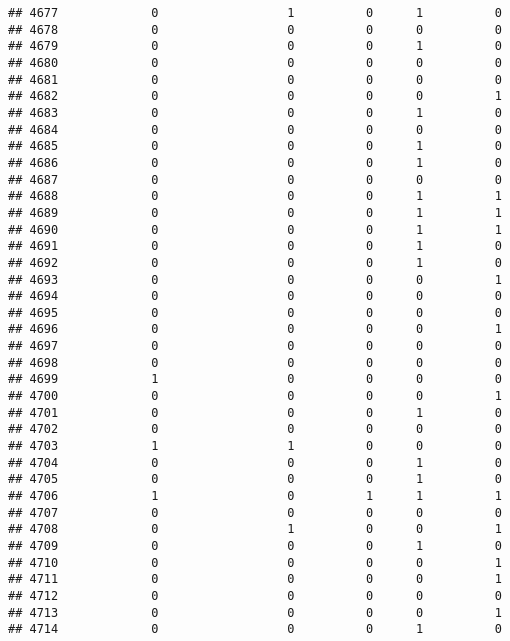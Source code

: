 \documentclass[
]{article}
\begin{document}
\begin{verbatim}
## 4677             0                  1          0      1          0
## 4678             0                  0          0      0          0
## 4679             0                  0          0      1          0
## 4680             0                  0          0      0          0
## 4681             0                  0          0      0          0
## 4682             0                  0          0      0          1
## 4683             0                  0          0      1          0
## 4684             0                  0          0      0          0
## 4685             0                  0          0      1          0
## 4686             0                  0          0      1          0
## 4687             0                  0          0      0          0
## 4688             0                  0          0      1          1
## 4689             0                  0          0      1          1
## 4690             0                  0          0      1          1
## 4691             0                  0          0      1          0
## 4692             0                  0          0      1          0
## 4693             0                  0          0      0          1
## 4694             0                  0          0      0          0
## 4695             0                  0          0      0          0
## 4696             0                  0          0      0          1
## 4697             0                  0          0      0          0
## 4698             0                  0          0      0          0
## 4699             1                  0          0      0          0
## 4700             0                  0          0      0          1
## 4701             0                  0          0      1          0
## 4702             0                  0          0      0          0
## 4703             1                  1          0      0          0
## 4704             0                  0          0      1          0
## 4705             0                  0          0      1          0
## 4706             1                  0          1      1          1
## 4707             0                  0          0      0          0
## 4708             0                  1          0      0          1
## 4709             0                  0          0      1          0
## 4710             0                  0          0      0          1
## 4711             0                  0          0      0          1
## 4712             0                  0          0      0          0
## 4713             0                  0          0      0          1
## 4714             0                  0          0      1          0

\end{verbatim}
\end{document}
